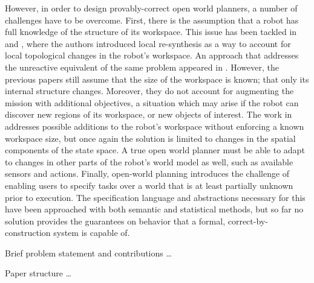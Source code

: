 However, in order to design provably-correct open world planners, a number of challenges have to be overcome. First, there is the assumption that a robot has full knowledge of the structure of its workspace. This issue has been tackled in \cite{MurrayICRA2012} and \cite{MurrayICRA2013a}, where the authors introduced local re-synthesis as a way to account for local topological changes in the robot's workspace. An approach that addresses the unreactive equivalent of the same problem appeared in \cite{Dimos2013ICRA}. However, the previous papers still assume that the size of the workspace is known; that only its internal structure changes. Moreover, they do not account for augmenting the mission with additional objectives, a situation which may arise if the robot can discover new regions of its workspace, or new objects of interest. The work in \cite{BingxinRSS2012} addresses possible additions to the robot's workspace without enforcing a known workspace size, but once again the solution is limited to changes in the spatial components of the state space. A true open world planner must be able to adapt to changes in other parts of the robot's world model as well, such as available sensors and actions. Finally, open-world planning introduces the challenge of enabling users to specify tasks over a world that is at least partially unknown prior to execution. The specification language and abstractions necessary for this have been approached with both semantic \cite{Joshi2012} \cite{Talamadupula2010} and statistical \cite{Tellex2011} methods, but so far no solution provides the guarantees on behavior that a formal, correct-by-construction system is capable of. 

Brief problem statement and contributions \ldots

Paper structure \ldots


